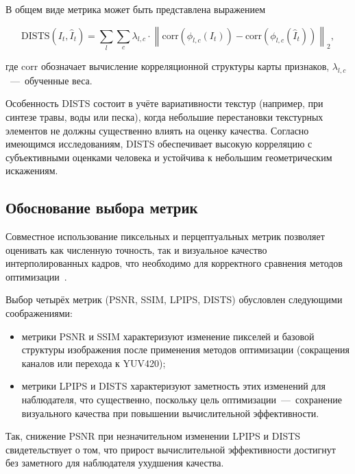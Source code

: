 В общем виде метрика может быть представлена выражением

\begin{equation}
	\text{DISTS}(I_t, \hat{I}_t) = \sum_{l} \sum_{c} \lambda_{l,c} \cdot \left\| \text{corr}\left(\phi_{l,c}(I_t)\right) - \text{corr}\left(\phi_{l,c}(\hat{I}_t)\right) \right\|_2,
\end{equation}

где $\text{corr}$ обозначает вычисление корреляционной структуры карты признаков, $\lambda_{l,c}$~---~обученные веса.

Особенность DISTS состоит в учёте вариативности текстур (например, при синтезе травы, воды или песка), когда небольшие перестановки текстурных элементов не должны существенно влиять на оценку качества. Согласно имеющимся исследованиям, DISTS обеспечивает высокую корреляцию с субъективными оценками человека и устойчива к небольшим геометрическим искажениям.

\subsection*{Обоснование выбора метрик}

Совместное использование пиксельных и перцептуальных метрик позволяет оценивать как численную точность, так и визуальное качество интерполированных кадров, что необходимо для корректного сравнения методов оптимизации~\cite{kye2026acevfi}.

Выбор четырёх метрик (PSNR, SSIM, LPIPS, DISTS) обусловлен следующими соображениями:

\begin{itemize}
	\item метрики PSNR и SSIM характеризуют изменение пикселей и базовой структуры изображения после применения методов оптимизации (сокращения каналов или перехода к YUV420);
	\item метрики LPIPS и DISTS характеризуют заметность этих изменений для наблюдателя, что существенно, поскольку цель оптимизации~---~сохранение визуального качества при повышении вычислительной эффективности.
\end{itemize}

Так, снижение PSNR при незначительном изменении LPIPS и DISTS свидетельствует о том, что прирост вычислительной эффективности достигнут без заметного для наблюдателя ухудшения качества.
